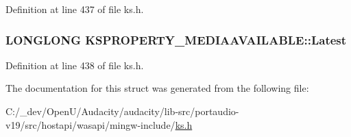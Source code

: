 Definition at line 437 of file ks.\+h.

\subsubsection[{\texorpdfstring{Latest}{Latest}}]{\setlength{\rightskip}{0pt plus 5cm}L\+O\+N\+G\+L\+O\+NG K\+S\+P\+R\+O\+P\+E\+R\+T\+Y\+\_\+\+M\+E\+D\+I\+A\+A\+V\+A\+I\+L\+A\+B\+L\+E\+::\+Latest}\hypertarget{struct_k_s_p_r_o_p_e_r_t_y___m_e_d_i_a_a_v_a_i_l_a_b_l_e_a22df0452fc14201d10124a3eb59376d8}{}\label{struct_k_s_p_r_o_p_e_r_t_y___m_e_d_i_a_a_v_a_i_l_a_b_l_e_a22df0452fc14201d10124a3eb59376d8}


Definition at line 438 of file ks.\+h.



The documentation for this struct was generated from the following file\+:\begin{DoxyCompactItemize}
\item 
C\+:/\+\_\+dev/\+Open\+U/\+Audacity/audacity/lib-\/src/portaudio-\/v19/src/hostapi/wasapi/mingw-\/include/\hyperlink{ks_8h}{ks.\+h}\end{DoxyCompactItemize}
